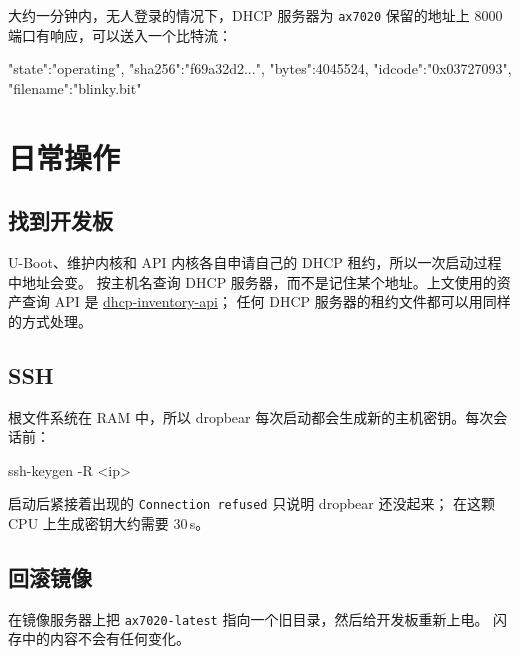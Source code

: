 \documentclass[11pt,a4paper,oneside]{article}
\newcommand{\file}[1]{{\color{bluemid}\nolinkurl{#1}}}
\newcommand{\cmd}[1]{\texttt{#1}}
\begin{document}
\begin{checkpoint}
大约一分钟内，无人登录的情况下，DHCP 服务器为 \cmd{ax7020} 保留的地址上
8000 端口有响应，可以送入一个比特流：
\begin{code}
{"state":"operating", "sha256":"f69a32d2...", "bytes":4045524,
 "idcode":"0x03727093", "filename":"blinky.bit"}
\end{code}
\end{checkpoint}

\section{日常操作}

\subsection{找到开发板}

U-Boot、维护内核和 API 内核各自申请自己的 DHCP 租约，所以一次启动过程中地址会变。
按主机名查询 DHCP 服务器，而不是记住某个地址。上文使用的资产查询 API 是
\href{https://github.com/MaxClerkwell/dhcp-inventory-api}{dhcp-inventory-api}；
任何 DHCP 服务器的租约文件都可以用同样的方式处理。

\subsection{SSH}

根文件系统在 RAM 中，所以 dropbear 每次启动都会生成新的主机密钥。每次会话前：

\begin{shell}
ssh-keygen -R <ip>
\end{shell}

启动后紧接着出现的 \cmd{Connection refused} 只说明 dropbear 还没起来；
在这颗 CPU 上生成密钥大约需要 30\,s。

\subsection{回滚镜像}

在镜像服务器上把 \file{ax7020-latest} 指向一个旧目录，然后给开发板重新上电。
闪存中的内容不会有任何变化。
\end{document}
